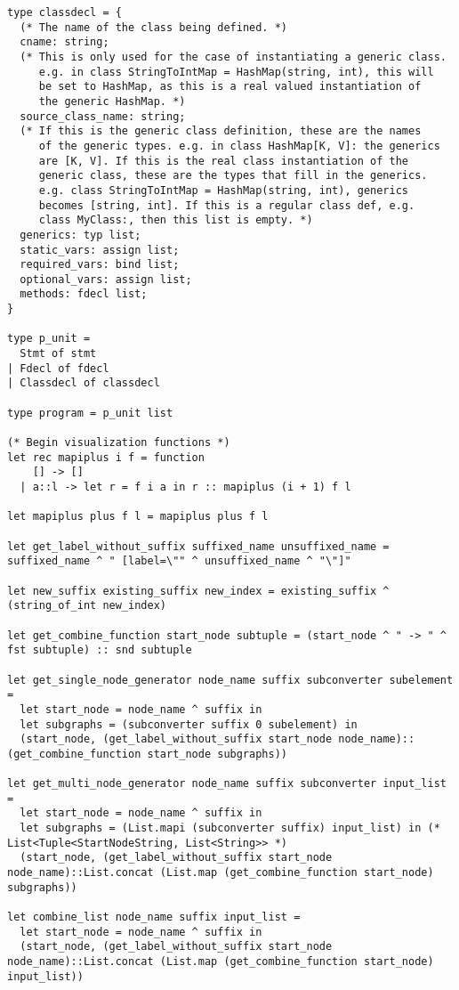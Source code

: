 \documentclass{article}
\begin{document}
\begin{verbatim}
type classdecl = {
  (* The name of the class being defined. *)
  cname: string;
  (* This is only used for the case of instantiating a generic class.
     e.g. in class StringToIntMap = HashMap(string, int), this will
     be set to HashMap, as this is a real valued instantiation of
     the generic HashMap. *)
  source_class_name: string;
  (* If this is the generic class definition, these are the names
     of the generic types. e.g. in class HashMap[K, V]: the generics
     are [K, V]. If this is the real class instantiation of the
     generic class, these are the types that fill in the generics.
     e.g. class StringToIntMap = HashMap(string, int), generics
     becomes [string, int]. If this is a regular class def, e.g.
     class MyClass:, then this list is empty. *)
  generics: typ list;
  static_vars: assign list;
  required_vars: bind list;
  optional_vars: assign list;
  methods: fdecl list;
}

type p_unit =
  Stmt of stmt
| Fdecl of fdecl
| Classdecl of classdecl

type program = p_unit list

(* Begin visualization functions *)
let rec mapiplus i f = function
    [] -> []
  | a::l -> let r = f i a in r :: mapiplus (i + 1) f l

let mapiplus plus f l = mapiplus plus f l

let get_label_without_suffix suffixed_name unsuffixed_name = suffixed_name ^ " [label=\"" ^ unsuffixed_name ^ "\"]"

let new_suffix existing_suffix new_index = existing_suffix ^ (string_of_int new_index)

let get_combine_function start_node subtuple = (start_node ^ " -> " ^ fst subtuple) :: snd subtuple

let get_single_node_generator node_name suffix subconverter subelement =
  let start_node = node_name ^ suffix in
  let subgraphs = (subconverter suffix 0 subelement) in
  (start_node, (get_label_without_suffix start_node node_name)::(get_combine_function start_node subgraphs))

let get_multi_node_generator node_name suffix subconverter input_list =
  let start_node = node_name ^ suffix in
  let subgraphs = (List.mapi (subconverter suffix) input_list) in (* List<Tuple<StartNodeString, List<String>> *)
  (start_node, (get_label_without_suffix start_node node_name)::List.concat (List.map (get_combine_function start_node) subgraphs))

let combine_list node_name suffix input_list =
  let start_node = node_name ^ suffix in
  (start_node, (get_label_without_suffix start_node node_name)::List.concat (List.map (get_combine_function start_node) input_list))


\end{verbatim}
\end{document}
